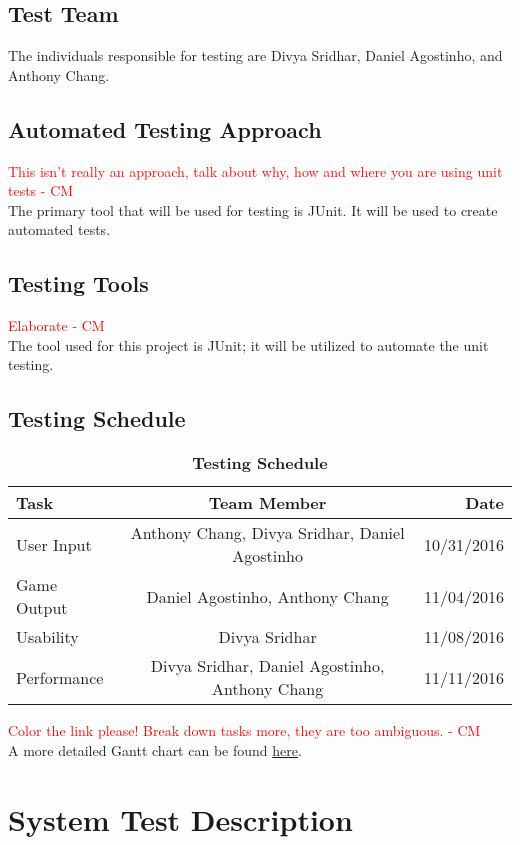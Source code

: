 \documentclass[12pt, titlepage]{article}
\begin{document}
\subsection{Test Team}
The individuals responsible for testing are Divya Sridhar, Daniel Agostinho, and Anthony Chang.
\subsection{Automated Testing Approach}
\textcolor{red}{This isn't really an approach, talk about why, how and where you are using unit tests - CM} \\
The primary tool that will be used for testing is JUnit. It will be used to create automated tests.
\subsection{Testing Tools}
\textcolor{red}{Elaborate - CM} \\
The tool used for this project is JUnit; it will be utilized to automate the unit testing.
\subsection{Testing Schedule}
\begin{table}[!htbp]
\centering
\caption{\bf Testing Schedule}
\label{Table}	

\begin{tabular}[pos]{|l|c|r|}
\hline
\color{red}\textbf{Task}& \color{red}\textbf{Team Member} & \color{red}\textbf{Date} \\ \hline
User Input & Anthony Chang, Divya Sridhar, Daniel Agostinho & 10/31/2016\\ \hline
Game Output &  Daniel Agostinho, Anthony Chang & 11/04/2016\\ \hline
Usability & Divya Sridhar & 11/08/2016\\ \hline
Performance & Divya Sridhar, Daniel Agostinho, Anthony Chang & 11/11/2016\\ \hline 
		
\end{tabular}
\end{table}		
\textcolor{red}{Color the link please! Break down tasks more, they are too ambiguous.  - CM} \\
A more detailed Gantt chart can be found \href{run:./Team11_gantt.gan}{here}.

\section{System Test Description}
\end{document}
